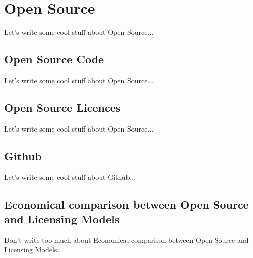\section{Open Source}

Let's write some cool stuff about Open Source...


\subsection{Open Source Code}

Let's write some cool stuff about Open Source...

\subsection{Open Source Licences}

Let's write some cool stuff about Open Source...

\subsection{Github}

Let's write some cool stuff about Github...

\subsection{Economical comparison between Open Source and Licensing Models}

Don't write too much about Economical comparison between Open Source and Licensing Models...
